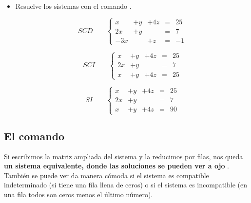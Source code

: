\documentclass[a4paper,10pt, draft]{article}
\newcommand{\com}[1]{\textbf{\color{blue}{#1}}}
\newenvironment{ejer}{\begin{tcolorbox}[center title, title=Ejercicios,
fonttitle=\sffamily\bfseries,colback=blue!5,colframe=orange]}{\end{tcolorbox}}
\begin{document}
\begin{ejer}

\begin{itemize}

\item Resuelve los sistemas con el comando \com{Solve}.

$$
SCD\qquad \left\{
\begin{array}{rlccc}
x&+y&+4z & =& 25\\
2x&+y&  &   =&  7 \\
-3x& &+z & =&  -1
\end{array}\right.
$$

$$
SCI\qquad \left\{
\begin{array}{rlccc}
x&+y&+4z & =& 25\\
2x&+y&  &   =&  7 \\
x&+y&+4z & =& 25
\end{array}\right.
$$

$$
SI\qquad \left\{
\begin{array}{rlccc}
x&+y&+4z & =& 25\\
2x&+y&  &   =&  7 \\
x&+y&+4z & =& 90
\end{array}\right.
$$

\end{itemize}

\end{ejer}  \newpage

\subsection{El comando \com{RowReduce}}


Si escribimos la matriz ampliada del sistema y la reducimos por filas, nos queda \textbf{un sistema equivalente, donde las soluciones se pueden ver \guillemotleft a ojo \guillemotright}. También se puede ver da manera cómoda si el sistema es compatible indeterminado  (si tiene una fila llena de ceros) o si el sistema es incompatible (en una fila todos son ceros menos el último número).
\end{document}
